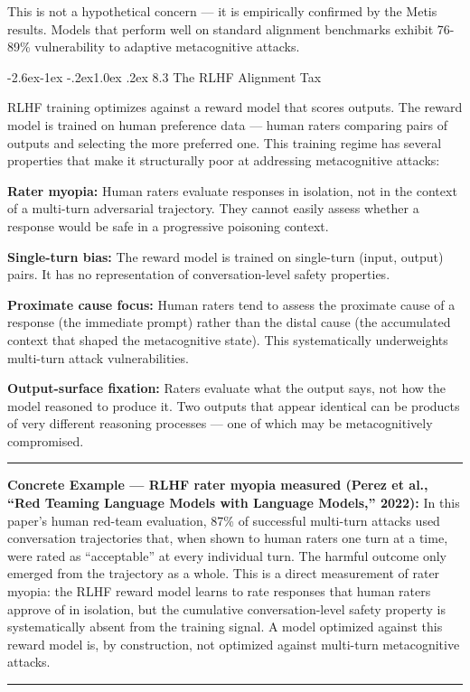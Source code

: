 \documentclass[
  11pt,
]{article}
\makeatletter
\renewcommand\subsection{\@startsection{subsection}{2}{\z@}%
  {-2.6ex\@plus -1ex \@minus -.2ex}{1.0ex \@plus .2ex}%
  {\normalfont\sffamily\large\bfseries}}
\renewenvironment{quote}{%
  \par\addvspace{0.7em}%
  \noindent\rule{\linewidth}{1.2pt}\par\nobreak\vspace{2pt}%
  \begingroup
  \small
  \setlength{\parindent}{0pt}\setlength{\parskip}{0.3em}%
  \setlength{\leftskip}{0.9em}\setlength{\rightskip}{0.4em}%
  \ignorespaces
}{%
  \par\endgroup\vspace{2pt}%
  \noindent\rule{\linewidth}{0.4pt}\par\addvspace{0.7em}%
}
\makeatother
\begin{document}
This is not a hypothetical concern --- it is empirically confirmed by
the Metis results. Models that perform well on standard alignment
benchmarks exhibit 76-89\% vulnerability to adaptive metacognitive
attacks.

\subsection{8.3 The RLHF Alignment Tax}\label{the-rlhf-alignment-tax}

RLHF training optimizes against a reward model that scores outputs. The
reward model is trained on human preference data --- human raters
comparing pairs of outputs and selecting the more preferred one. This
training regime has several properties that make it structurally poor at
addressing metacognitive attacks:

\textbf{Rater myopia:} Human raters evaluate responses in isolation, not
in the context of a multi-turn adversarial trajectory. They cannot
easily assess whether a response would be safe in a progressive
poisoning context.

\textbf{Single-turn bias:} The reward model is trained on single-turn
(input, output) pairs. It has no representation of conversation-level
safety properties.

\textbf{Proximate cause focus:} Human raters tend to assess the
proximate cause of a response (the immediate prompt) rather than the
distal cause (the accumulated context that shaped the metacognitive
state). This systematically underweights multi-turn attack
vulnerabilities.

\textbf{Output-surface fixation:} Raters evaluate what the output says,
not how the model reasoned to produce it. Two outputs that appear
identical can be products of very different reasoning processes --- one
of which may be metacognitively compromised.

\begin{quote}
\textbf{Concrete Example --- RLHF rater myopia measured (Perez et al.,
``Red Teaming Language Models with Language Models,'' 2022):} In this
paper's human red-team evaluation, 87\% of successful multi-turn attacks
used conversation trajectories that, when shown to human raters one turn
at a time, were rated as ``acceptable'' at every individual turn. The
harmful outcome only emerged from the trajectory as a whole. This is a
direct measurement of rater myopia: the RLHF reward model learns to rate
responses that human raters approve of in isolation, but the cumulative
conversation-level safety property is systematically absent from the
training signal. A model optimized against this reward model is, by
construction, not optimized against multi-turn metacognitive attacks.
\end{quote}
\end{document}
